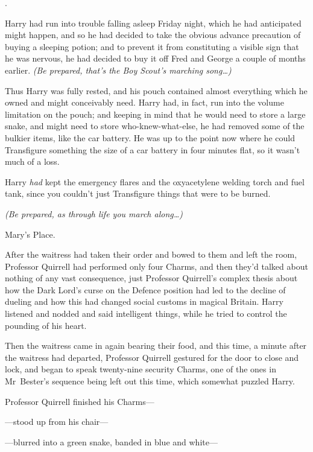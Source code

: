 
.

\hplettrineextrapara
Harry had run into trouble falling asleep Friday night, which he had anticipated might happen, and so he had decided to take the obvious advance precaution of buying a sleeping potion; and to prevent it from constituting a visible sign that he was nervous, he had decided to buy it off Fred and George a couple of months earlier. \emph{(Be prepared, that’s the Boy Scout’s marching song…)}

Thus Harry was fully rested, and his pouch contained almost everything which he owned and might conceivably need. Harry had, in fact, run into the volume limitation on the pouch; and keeping in mind that he would need to store a large snake, and might need to store who-knew-what-else, he had removed some of the bulkier items, like the car battery. He was up to the point now where he could Transfigure something the size of a car battery in four minutes flat, so it wasn’t much of a loss.

Harry \emph{had} kept the emergency flares and the oxyacetylene welding torch and fuel tank, since you couldn’t just Transfigure things that were to be burned.

\emph{(Be prepared, as through life you march along…)}

Mary’s Place.

After the waitress had taken their order and bowed to them and left the room, Professor Quirrell had performed only four Charms, and then they’d talked about nothing of any vast consequence, just Professor Quirrell’s complex thesis about how the Dark Lord’s curse on the Defence position had led to the decline of dueling and how this had changed social customs in magical Britain. Harry listened and nodded and said intelligent things, while he tried to control the pounding of his heart.

Then the waitress came in again bearing their food, and this time, a minute after the waitress had departed, Professor Quirrell gestured for the door to close and lock, and began to speak twenty-nine security Charms, one of the ones in Mr~Bester’s sequence being left out this time, which somewhat puzzled Harry.

Professor Quirrell finished his Charms—

—stood up from his chair—

—blurred into a green snake, banded in blue and white—

